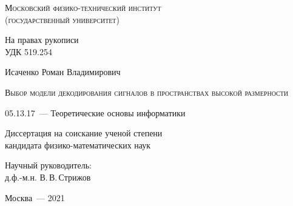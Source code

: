 \thispagestyle{empty}


\begin{titlepage}
	\begin{center}
		\textsc{Московский физико-технический институт \\ (государственный университет)}\\
	\end{center}
	\vspace{1.5cm}
	\begin{flushright}
		{На правах рукописи\\
			УДК 519.254}
	\end{flushright}
	\vspace{1.5cm}
	\begin{center}
		{Исаченко Роман Владимирович}
		\par
		\vspace{2cm}
		\textsc{Выбор модели декодирования сигналов в пространствах высокой размерности}
		\par
		\vspace{2cm}
		{05.13.17~--- Теоретические основы информатики}
		\par
		\vspace{2cm}
		{Диссертация на соискание ученой степени\\
			кандидата физико-математических наук}
	\end{center}
	\vspace{2cm}
	\hfill\parbox{8,4cm}{Научный руководитель:
		\\д.ф.-м.н. В.\,В.\,Стрижов}
	\par
	\vspace{3.5cm}
	\begin{center}
		{Москва~--- 2021}
	\end{center}
\end{titlepage}